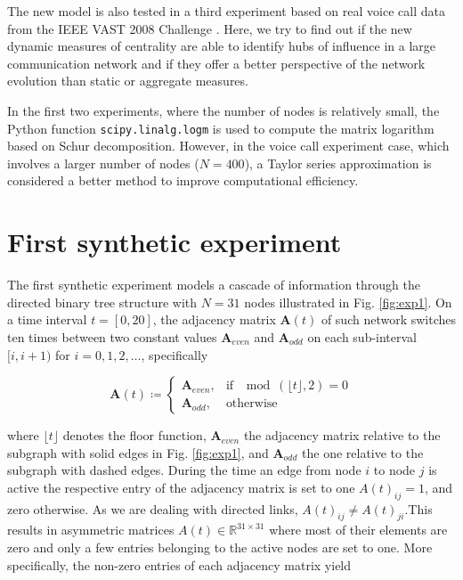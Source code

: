 The new model is also tested in a third experiment based on real voice call data from the IEEE VAST 2008 Challenge \cite{grinstein2008vast}. Here, we try to find out if the new dynamic measures of centrality are able to identify hubs of influence in a large communication network and if they offer a better perspective of the network evolution than static or aggregate measures.

In the first two experiments, where the number of nodes is relatively small, the Python function \texttt{scipy.linalg.logm} is used to compute the matrix logarithm based on Schur decomposition. However, in the voice call experiment case, which involves a larger number of nodes ($N=400$), a Taylor series approximation is considered a better method to improve computational efficiency.

\section{First synthetic experiment}
\label{sec:synexp1}

The first synthetic experiment models a cascade of information through the directed binary tree structure with $N=31$ nodes illustrated in Fig. \ref{fig:exp1}. On a time interval $t = [0, 20]$, the adjacency matrix $\mathbf{A}(t)$ of such network switches ten times between two constant values $\mathbf{A}_{even}$ and $\mathbf{A}_{odd}$ on each sub-interval $[i, i + 1)$ for $i=0,1,2,\dots$, specifically

\begin{equation*}
\mathbf{A}(t)\coloneqq
    \begin{cases}
        \mathbf{A}_{even}, & \text{if } \mod(\lfloor t \rfloor, 2) = 0\\
        \mathbf{A}_{odd}, & \text{otherwise} 
    \end{cases}
\end{equation*}

where $\lfloor t \rfloor$ denotes the floor function, $\mathbf{A}_{even}$ the adjacency matrix relative to the subgraph with solid edges in Fig. \ref{fig:exp1}, and $\mathbf{A}_{odd}$ the one relative to the subgraph with dashed edges. During the time an edge from node $i$ to node $j$ is active the respective entry of the adjacency matrix is set to one $A(t)_{ij}=1$, and zero otherwise. As we are dealing with directed links, $A(t)_{ij}\ne A(t)_{ji}$.This results in asymmetric matrices $A(t)\in \mathbb{R}^{31\times 31}$ where most of their elements are zero and only a few entries belonging to the active nodes are set to one. More specifically, the non-zero entries of each adjacency matrix yield

